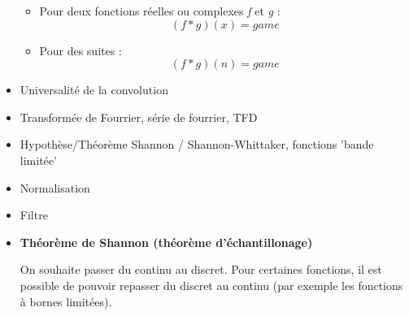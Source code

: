 \documentclass{article}
\begin{document}
\begin{itemize}
\begin{itemize}

\item Pour deux fonctions réelles ou complexes \textit{f} et \textit{g} :
\[ (f * g)(x) = game \]

\item Pour des suites : 
\[ (f * g)(n) = game \]

\end{itemize}


\item Universalité de la convolution

\item Transformée de Fourrier, série de fourrier, TFD
\item Hypothèse/Théorème Shannon / Shannon-Whittaker, fonctions 'bande limitée'
\item Normalisation

\item Filtre

\item \textbf{Théorème de Shannon (théorème d'échantillonage)}

On souhaite passer du continu au discret. Pour certaines fonctions, il est possible de pouvoir repasser du discret au continu (par exemple les fonctions à bornes limitées). 

\end{itemize}
\end{document}
